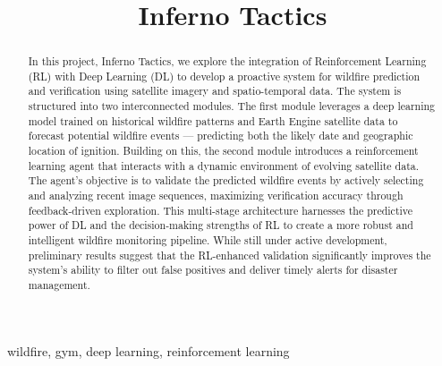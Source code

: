 \documentclass[conference]{IEEEtran}
\begin{document}
\title{Inferno Tactics\\
}

\author{
\and
{}
}

\maketitle

\begin{abstract}
    In this project, Inferno Tactics, we explore the integration of Reinforcement Learning (RL) with Deep Learning (DL) to develop a proactive system for wildfire prediction and verification using satellite imagery and spatio-temporal data. The system is structured into two interconnected modules. The first module leverages a deep learning model trained on historical wildfire patterns and Earth Engine satellite data to forecast potential wildfire events — predicting both the likely date and geographic location of ignition. Building on this, the second module introduces a reinforcement learning agent that interacts with a dynamic environment of evolving satellite data. The agent’s objective is to validate the predicted wildfire events by actively selecting and analyzing recent image sequences, maximizing verification accuracy through feedback-driven exploration. This multi-stage architecture harnesses the predictive power of DL and the decision-making strengths of RL to create a more robust and intelligent wildfire monitoring pipeline. While still under active development, preliminary results suggest that the RL-enhanced validation significantly improves the system’s ability to filter out false positives and deliver timely alerts for disaster management.
\end{abstract}

\begin{IEEEkeywords}
wildfire, gym, deep learning, reinforcement learning
\end{IEEEkeywords}
\end{document}
